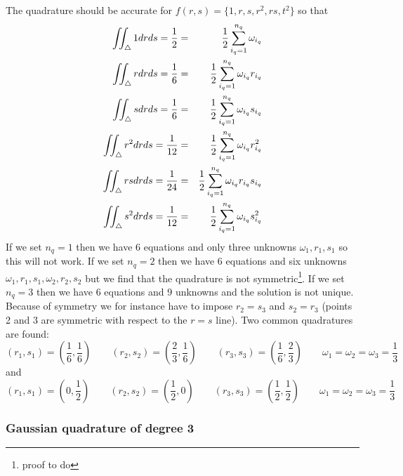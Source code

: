 The quadrature should be accurate for $f(r,s)=\{1,r,s,r^2,rs,t^2\}$ so that
\begin{eqnarray}
\iint_\triangle 1 drds = \frac12 &=& \frac12 \sum_{i_q=1}^{n_q}\omega_{i_q} \nonumber\\
\iint_\triangle r drds = \frac16 &=& \frac12 \sum_{i_q=1}^{n_q}\omega_{i_q} r_{i_q}\nonumber\\
\iint_\triangle s drds = \frac16 &=& \frac12 \sum_{i_q=1}^{n_q}\omega_{i_q} s_{i_q}\nonumber\\
\iint_\triangle r^2 drds = \frac1{12} &=& \frac12 \sum_{i_q=1}^{n_q}\omega_{i_q} r_{i_q}^2\nonumber\\
\iint_\triangle rsdrds = \frac1{24} &=& \frac12 \sum_{i_q=1}^{n_q}\omega_{i_q} r_{i_q}s_{i_q}\nonumber\\
\iint_\triangle s^2 drds = \frac1{12} &=& \frac12 \sum_{i_q=1}^{n_q}\omega_{i_q} s_{i_q}^2\nonumber\\
\end{eqnarray}
If we set $n_q=1$ then we have 6 equations and only three unknowns $\omega_1,r_1,s_1$
so this will not work. 
If we set $n_q=2$ then we have 6 equations and six unknowns $\omega_1,r_1,s_1,\omega_2,r_2,s_2$ but we find that the quadrature is not symmetric\footnote{proof to do}.
If we set $n_q=3$ then we have 6 equations and 9 unknowns and the solution is not 
unique. Because of symmetry we for instance have to impose $r_2=s_3$ and $s_2=r_3$ 
(points 2 and 3 are symmetric with respect to the $r=s$ line).
Two common quadratures are found:
\[
(r_1,s_1)=(\frac16,\frac16) \qquad
(r_2,s_2)=(\frac23,\frac16) \qquad
(r_3,s_3)=(\frac16,\frac23) \qquad \omega_1=\omega_2=\omega_3=\frac13
\]
and 
\[
(r_1,s_1)=(0,\frac12) \qquad
(r_2,s_2)=(\frac12,0) \qquad
(r_3,s_3)=(\frac12,\frac12) \qquad \omega_1=\omega_2=\omega_3=\frac13
\]

\subsubsection*{Gaussian quadrature of degree 3}

